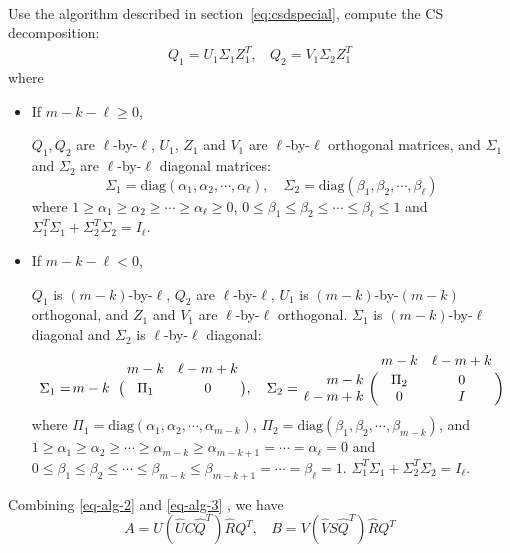 \paragraph{}
Use the algorithm described in section~\ref{eq:csdspecial}, compute
the CS decomposition:  
\begin{align} \label{eq-alg-3}
Q_1 = U_1\Sigma_{1}Z_1^{T}, \ \ \ \ 
Q_2 = V_1\Sigma_{2}Z_1^{T}
\end{align}
where
\begin{itemize}
\item If $m-k-\ell \geq 0$, 

$Q_1, Q_2$ are $\ell$-by-$\ell$,  
$U_{1}$, $Z_{1}$ and $V_{1}$ are $\ell$-by-$\ell$ orthogonal
matrices, and $\Sigma_{1}$ and $\Sigma_{2}$ are 
$\ell$-by-$\ell$ diagonal matrices: 
\[
\Sigma_{1} = \mbox{diag}(\alpha_{1}, \alpha_{2}, \cdots, \alpha_{\ell}), 
\quad
\Sigma_{2} = \mbox{diag}(\beta_{1}, \beta_{2}, \cdots, \beta_{\ell})
\]
where $1 \geq \alpha_{1} \geq \alpha_{2} \geq \cdots 
\geq \alpha_{\ell} \geq 0$,  
$0 \leq \beta_{1} \leq \beta_{2} \leq \cdots \leq \beta_{\ell} \leq 1$
and $\Sigma_{1}^{T}\Sigma_{1} + \Sigma_{2}^{T}\Sigma_{2} = I_{\ell}$.

\item If $m-k-\ell < 0$, 

$Q_1$ is $(m-k)$-by-$\ell$, $Q_2$ are $\ell$-by-$\ell$,  
$U_{1}$ is $(m-k)$-by-$(m-k)$ orthogonal, and 
$Z_{1}$ and $V_{1}$ are $\ell$-by-$\ell$ orthogonal. 
$\Sigma_{1}$ is $(m-k)$-by-$\ell$ diagonal and 
$\Sigma_{2}$ is $\ell$-by-$\ell$ diagonal:  
\[
\Sigma_{1} = \bordermatrix{ & m-k & \ell-m+k \cr
\hfill m-k & \Pi_{1} & 0 }, 
\quad
\Sigma_{2} = \bordermatrix{ & m-k & \ell-m+k   \cr
\hfill m-k & \Pi_{2} & 0\cr
\hfill \ell-m+k & 0 & I}
\]
where $\Pi_{1} = \mbox{diag}(\alpha_{1}, \alpha_{2}, \cdots, \alpha_{m-k})$, 
$\Pi_{2} = \mbox{diag}(\beta_{1}, \beta_{2}, \cdots, \beta_{m-k})$, 
and $1 \geq \alpha_{1} \geq \alpha_{2} \geq \cdots \geq \alpha_{m-k} \geq \alpha_{m-k+1} = \cdots = \alpha_{\ell} = 0$ and $0 \leq \beta_{1} \leq \beta_{2} \leq \cdots \leq \beta_{m-k} \leq \beta_{m-k+1} = \cdots = \beta_{\ell} = 1$.
$\Sigma_{1}^{T}\Sigma_{1} + \Sigma_{2}^{T}\Sigma_{2} = I_{\ell}$. 
\end{itemize}
Combining \eqref{eq-alg-2} and \eqref{eq-alg-3} , we have
\begin{equation} \label{eq-alg-4}
A = U(\hat{U}C\hat{Q}^{T})\hat{R}Q^{T}, \ \ \ \ 
B = V(\hat{V}S\hat{Q}^{T})\hat{R}Q^{T}
\end{equation}
